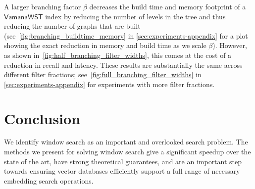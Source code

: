 \documentclass{article}
\newcommand{\myparagraph}[1]{\smallskip\noindent {\bf #1.}}
\theoremstyle{plain}
\theoremstyle{definition}
\theoremstyle{remark}
\newcommand{\julian}[1]{{\color{red}{\bf Julian:} #1}}
\newcommand{\algname}[1]{\ensuremath{\mathsf{#1}}}
\begin{document}
\myparagraph{Varying $\beta$}
A larger branching factor $\beta$ decreases the build time and memory footprint of a \algname{Vamana WST} index by reducing the number of levels in the tree and thus reducing the number of graphs that are built (see~\cref{fig:branching_buildtime_memory} in \cref{sec:experiments-appendix} for a plot showing the exact reduction in memory and build time as we  scale $\beta$). However, as shown in~\cref{fig:half_branching_filter_widths}, this comes at the cost of a reduction in recall and latency. These results are substantially the same across different filter fractions; see~\cref{fig:full_branching_filter_widths} in \cref{sec:experiments-appendix} for experiments with more filter fractions.






\section{Conclusion}
We identify window search as an important and overlooked search problem. The methods we present for solving window search give a significant speedup over the state of the art, have strong theoretical guarantees, and are an important step towards ensuring vector databases efficiently support a full range of necessary embedding search operations.



\end{document}
